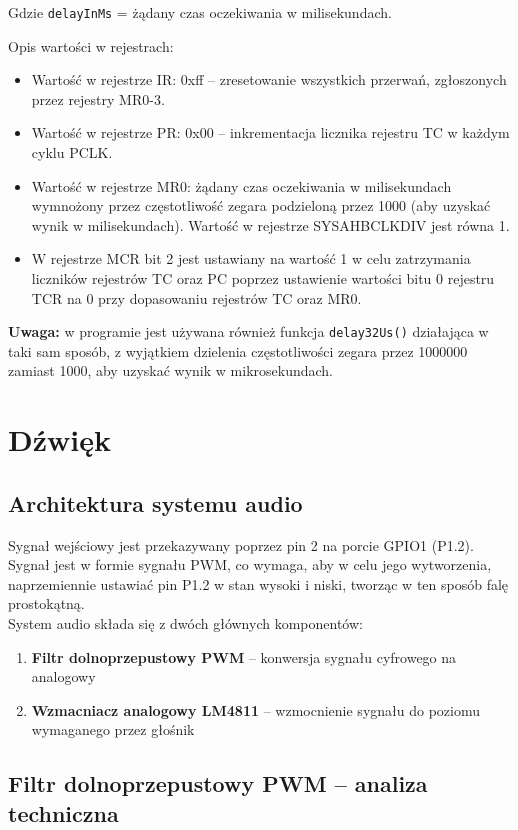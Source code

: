 \documentclass[a4paper,12pt]{report}
\begin{document}
Gdzie \texttt{delayInMs} = żądany czas oczekiwania w milisekundach.

Opis wartości w rejestrach:
\begin{itemize}
    \item Wartość w rejestrze IR: 0xff – zresetowanie wszystkich przerwań, zgłoszonych przez rejestry MR0-3.
    \item Wartość w rejestrze PR: 0x00 – inkrementacja licznika rejestru TC w każdym cyklu PCLK.
    \item Wartość w rejestrze MR0: żądany czas oczekiwania w milisekundach wymnożony przez częstotliwość zegara podzieloną przez 1000 (aby uzyskać wynik w milisekundach). Wartość w rejestrze SYSAHBCLKDIV jest równa 1.
    \item W rejestrze MCR bit 2 jest ustawiany na wartość 1 w celu zatrzymania liczników rejestrów TC oraz PC poprzez ustawienie wartości bitu 0 rejestru TCR na 0 przy dopasowaniu rejestrów TC oraz MR0.
\end{itemize}

\textbf{Uwaga:} w programie jest używana również funkcja \texttt{delay32Us()} działająca w taki sam sposób, z wyjątkiem dzielenia częstotliwości zegara przez 1000000 zamiast 1000, aby uzyskać wynik w mikrosekundach.

\section{Dźwięk}

\subsection{Architektura systemu audio}
Sygnał wejściowy jest przekazywany poprzez pin 2 na porcie GPIO1 (P1.2). Sygnał jest w formie sygnału PWM, co wymaga, aby w celu jego wytworzenia, naprzemiennie ustawiać pin P1.2 w stan wysoki i niski, tworząc w ten sposób falę prostokątną.\\
System audio składa się z dwóch głównych komponentów:
\begin{enumerate}
    \item \textbf{Filtr dolnoprzepustowy PWM} -- konwersja sygnału cyfrowego na analogowy
    \item \textbf{Wzmacniacz analogowy LM4811} -- wzmocnienie sygnału do poziomu wymaganego przez głośnik
\end{enumerate}

\subsection{Filtr dolnoprzepustowy PWM -- analiza techniczna}
\end{document}
